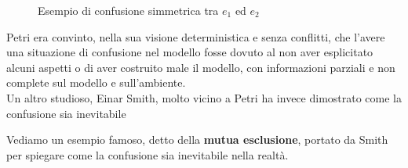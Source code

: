 \begin{definizione}
\begin{enumerate}
\begin{figure}[H]
      \caption{Esempio di confusione simmetrica tra $e_1$ ed $e_2$} 
    \end{figure}
  \end{enumerate}
  Petri era convinto, nella sua visione deterministica e senza conflitti, che
  l'avere una situazione di confusione nel modello fosse dovuto al non aver
  esplicitato alcuni aspetti o di aver costruito male il modello, con
  informazioni parziali e non complete sul modello e sull'ambiente.\\
  Un altro studioso, Einar Smith, molto vicino a Petri ha invece dimostrato come
  la confusione sia inevitabile
\end{definizione} \vspace{5mm} %
Vediamo un esempio famoso, detto della \textbf{mutua esclusione}, portato da
Smith per spiegare come la confusione sia inevitabile nella realtà.
\newpage
